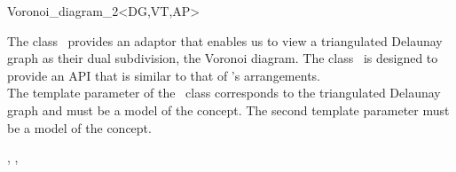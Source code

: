 

\begin{ccRefClass}{Voronoi_diagram_2<DG,VT,AP>}


\ccDefinition

The class \ccRefName\ provides an adaptor that enables us
to view a triangulated Delaunay graph as their dual subdivision, the
Voronoi diagram. The class \ccRefName\ is designed to provide an API
that is similar to that of \cgal's arrangements.\\
The template parameter of the \ccRefName\ class corresponds to the
triangulated Delaunay graph and must be a model of the
 concept. The second template parameter must be a
model of the  concept.


\ccRefines
{}, , 


\end{ccRefClass}
